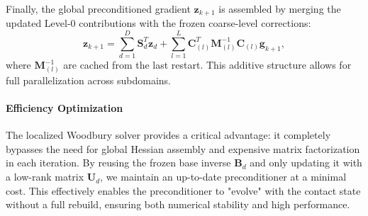 \documentclass[acmtog,anonymous,review,screen,nonacm]{acmart}
\begin{document}
Finally, the global preconditioned gradient $\mathbf{z}_{k+1}$ is assembled by merging the updated Level-0 contributions with the frozen coarse-level corrections:
\begin{equation}
    \mathbf{z}_{k+1} = \sum_{d=1}^D \mathbf{S}_d^T \mathbf{z}_d + \sum_{l=1}^L \mathbf{C}_{(l)}^T \mathbf{M}_{(l)}^{-1} \mathbf{C}_{(l)} \mathbf{g}_{k+1},
\end{equation}
where $\mathbf{M}_{(l)}^{-1}$ are cached from the last restart. This additive structure allows for full parallelization across subdomains.

\paragraph{Efficiency Optimization}
The localized Woodbury solver provides a critical advantage: it completely bypasses the need for global Hessian assembly and expensive matrix factorization in each iteration. By reusing the frozen base inverse $\mathbf{B}_d$ and only updating it with a low-rank matrix $\mathbf{U}_d$, we maintain an up-to-date preconditioner at a minimal cost. This effectively enables the preconditioner to "evolve" with the contact state without a full rebuild, ensuring both numerical stability and high performance.
\end{document}
